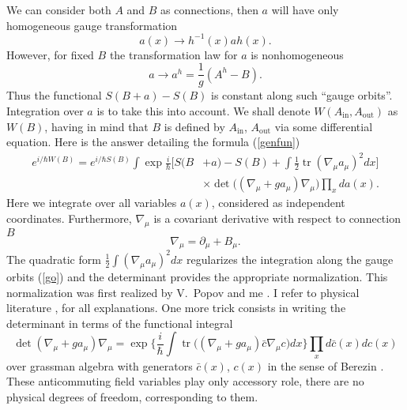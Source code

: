 \documentclass[12pt]{article}
\DeclareMathOperator{\tr}{tr}
\begin{document}
	We can consider both
    $ A $
	and
    $ B $
	as connections, then 
    $ a $
	will have only homogeneous gauge transformation
\begin{equation*}
    a(x) \to h^{-1}(x) a h(x) .
\end{equation*}
	However, for fixed 
    $ B $
	the transformation law for
    $ a $
	is nonhomogeneous
\begin{equation}
\label{go}
    a \to a^{h} = \frac{1}{g} (A^{h} - B) .
\end{equation}
	Thus the functional
    $ S(B+a) - S(B)$
	is constant along such ``gauge orbits''.
	Integration over
    $ a $
	is to take this into account.
	We shall denote
    $ W(A_{\text{in}}, A_{\text{out}}) $
	as
    $ W(B) $,
	having in mind that 
    $ B $
	is defined by
    $ A_{\text{in}} $,
    $ A_{\text{out}} $
	via some differential equation.
	Here is the answer detailing the formula
(\ref{genfun})
\begin{equation}
\label{idet}
\begin{split}
    e^{i/\hbar W(B)} = e^{i/\hbar S(B)} \int \exp \frac{i}{\hbar}
	\bigl[ S(B&+a)-S(B) 
	    + \int \frac{1}{2} \tr (\nabla_{\mu} a_{\mu})^{2} dx\bigr] \\
	& \times \det \bigl((\nabla_{\mu}+ g a_{\mu}) 
	    \nabla_{\mu}\bigr) \prod_{x} d a(x) .
\end{split}
\end{equation}
	Here we integrate over all variables
    $ a(x) $,
	considered as independent coordinates.
	Furthermore,
    $ \nabla_{\mu} $
	is a covariant derivative with respect to connection
    $ B $
\begin{equation*}
    \nabla_{\mu} = \partial_{\mu} + B_{\mu} .
\end{equation*}
	The quadratic form
    $ \frac{1}{2} \int (\nabla_{\mu} a_{\mu})^{2} dx $
	regularizes the integration along the gauge orbits
(\ref{go})
	and the determinant provides the appropriate normalization.
	This normalization was first realized by V.~Popov and me
\cite{FP}.
	I refer to physical literature
\cite{FS}, \cite{Peskin}
	for all explanations.
	One more trick consists in writing the determinant in terms 
	of the functional integral
\begin{equation*}
    \det (\nabla_{\mu} + g a_{\mu}) \nabla_{\mu} =
	\exp \bigl\{ \frac{i}{\hbar} \int \tr \bigl( (\nabla_{\mu} + g a_{\mu})
	    \bar{c} \nabla_{\mu} c \bigr) dx \bigr\}
	\prod_{x} d \bar{c}(x) d c(x)
\end{equation*}
	over grassman algebra with generators
    $ \bar{c}(x) $, $ c(x) $
	in the sense of Berezin
\cite{Berezin}.
	These anticommuting field variables play only accessory role,
	there are no physical degrees of freedom, corresponding
	to them.
\end{document}
